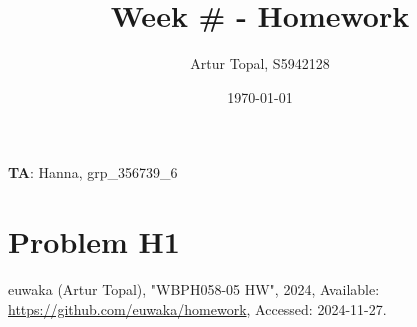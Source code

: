 \documentclass{article}
\title{Week # - Homework}
\author{Artur Topal, S5942128}
\date{\today}
\begin{document}
\maketitle

\begin{center}
  \textbf{TA}: Hanna, grp\_356739\_6
\end{center}

\pagebreak

\section{ Problem H1 } 

\begin{thebibliography}{99}

{euwaka (Artur Topal)}, "WBPH058-05 HW", 2024, Available: \url{https://github.com/euwaka/homework}, Accessed: 2024-11-27.
  
\end{thebibliography}
\end{document}
